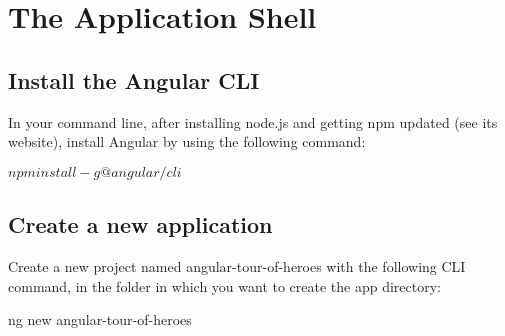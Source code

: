 \chapter{The Application Shell}
\section{Install the Angular CLI}
In your command line, after installing node.js and
getting npm updated (see its website), install
Angular by using the following command:

$npm install -g @angular/cli$

\section{Create a new application}
Create a new project named angular-tour-of-heroes with
the following CLI command, in the folder in which you
want to create the app directory:

ng new angular-tour-of-heroes